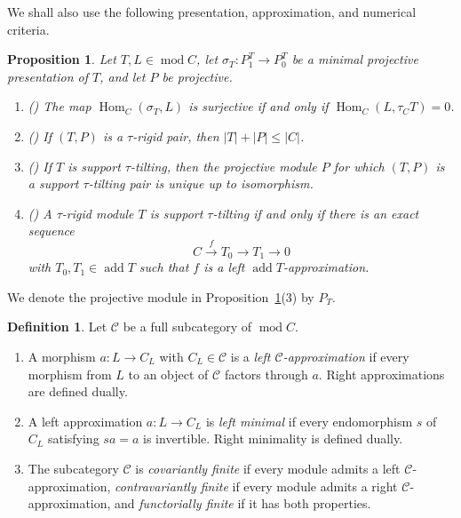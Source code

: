\documentclass[11pt,reqno]{amsart}
\newtheorem{proposition}[theorem]{Proposition}
\theoremstyle{definition}
\newtheorem{definition}[theorem]{Definition}
\theoremstyle{remark}
\newcommand{\modu}{\operatorname{mod}}
\newcommand{\addc}{\operatorname{add}}
\newcommand{\Hom}{\operatorname{Hom}}
\numberwithin{equation}{section}
\begin{document}
We shall also use the following presentation, approximation, and numerical
criteria.

\begin{proposition}
\label{prop:AIR-criteria}
Let $T,L\in\modu C$, let
$\sigma_T:P_1^T\to P_0^T$ be a minimal projective presentation of $T$,
and let $P$ be projective.
\begin{enumerate}[label=\textup{(\arabic*)},leftmargin=2.2em]
 \item \textup{(\cite[Proposition~2.4(b)]{AIR})} The map
$\Hom_C(\sigma_T,L)$ is surjective if and only if
 $\Hom_C(L,\tau_CT)=0$.
 \item \textup{(\cite[Propositions~1.3 and 2.3(a)]{AIR})} If $(T,P)$ is a
$\tau$-rigid pair, then
 $|T|+|P|\leq |C|$.
 \item \textup{(\cite[Proposition~2.3(b)]{AIR})} If $T$ is support
$\tau$-tilting, then the projective module
 $P$ for which $(T,P)$ is a support $\tau$-tilting pair is unique up to
 isomorphism.
 \item \textup{(\cite[Proposition~2.14]{Jasso})} A $\tau$-rigid module $T$
is support $\tau$-tilting if and only if there is an exact sequence
\[
 C\xrightarrow{f}T_0\longrightarrow T_1\longrightarrow0
\]
with $T_0,T_1\in\addc T$ such that $f$ is a left
$\addc T$-approximation.
\end{enumerate}
\end{proposition}

We denote the projective module in
Proposition~\ref{prop:AIR-criteria}\textup{(3)} by $P_T$.

\begin{definition}\label{def:approximations}
Let $\mathcal C$ be a full subcategory of $\modu C$.
\begin{enumerate}[label=\textup{(\arabic*)},leftmargin=2.2em,nosep]
 \item A morphism $a:L\to C_L$ with $C_L\in\mathcal C$ is a \emph{left
 $\mathcal C$-approximation} if every morphism from $L$ to an object of
 $\mathcal C$ factors through $a$.  Right approximations are defined
 dually.
 \item A left approximation $a:L\to C_L$ is \emph{left minimal} if every
 endomorphism $s$ of $C_L$ satisfying $sa=a$ is invertible.  Right
 minimality is defined dually.
 \item The subcategory $\mathcal C$ is \emph{covariantly finite} if every
 module admits a left $\mathcal C$-approximation, \emph{contravariantly
 finite} if every module admits a right $\mathcal C$-approximation, and
 \emph{functorially finite} if it has both properties.
\end{enumerate}
\end{definition}
\end{document}
